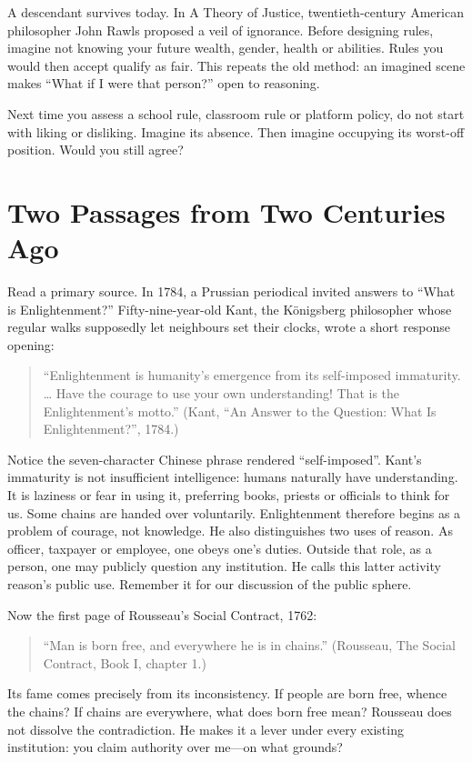 A descendant survives today. In A Theory of Justice, twentieth-century American philosopher John Rawls proposed a veil of ignorance. Before designing rules, imagine not knowing your future wealth, gender, health or abilities. Rules you would then accept qualify as fair. This repeats the old method: an imagined scene makes ``What if I were that person?'' open to reasoning.

Next time you assess a school rule, classroom rule or platform policy, do not start with liking or disliking. Imagine its absence. Then imagine occupying its worst-off position. Would you still agree?

\section{Two Passages from Two Centuries Ago}
Read a primary source. In 1784, a Prussian periodical invited answers to ``What is Enlightenment?'' Fifty-nine-year-old Kant, the Königsberg philosopher whose regular walks supposedly let neighbours set their clocks, wrote a short response opening:

\begin{quote}
``Enlightenment is humanity's emergence from its self-imposed immaturity. \ldots{} Have the courage to use your own understanding! That is the Enlightenment's motto.'' (Kant, ``An Answer to the Question: What Is Enlightenment?'', 1784.)
\end{quote}
Notice the seven-character Chinese phrase rendered ``self-imposed''. Kant's immaturity is not insufficient intelligence: humans naturally have understanding. It is laziness or fear in using it, preferring books, priests or officials to think for us. Some chains are handed over voluntarily. Enlightenment therefore begins as a problem of courage, not knowledge. He also distinguishes two uses of reason. As officer, taxpayer or employee, one obeys one's duties. Outside that role, as a person, one may publicly question any institution. He calls this latter activity reason's public use. Remember it for our discussion of the public sphere.

Now the first page of Rousseau's Social Contract, 1762:

\begin{quote}
``Man is born free, and everywhere he is in chains.'' (Rousseau, The Social Contract, Book I, chapter 1.)
\end{quote}
Its fame comes precisely from its inconsistency. If people are born free, whence the chains? If chains are everywhere, what does born free mean? Rousseau does not dissolve the contradiction. He makes it a lever under every existing institution: you claim authority over me---on what grounds?

